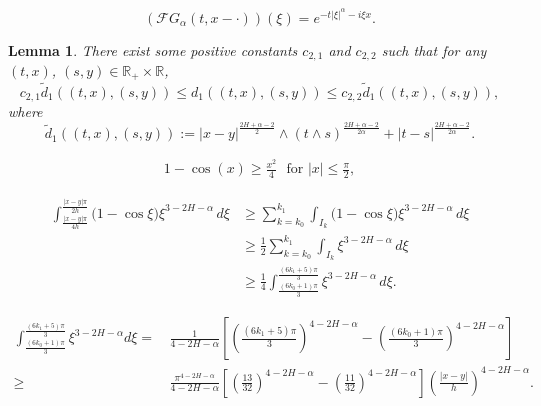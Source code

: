 \documentclass[10pt,a4paper]{amsart}
\newtheorem{lemma}{Lemma}
\def\RR{\mathbb{R}}
\begin{document}
\begin{equation}\label{Fourier}
(\mathcal {F}G_{\alpha}(t,x-\cdot))(\xi)=e^{-t|\xi|^{\alpha}-i\xi x}.
\end{equation}

\begin{lemma}\label{metric} There exist some  positive constants $c_{2,1}$ and $c_{2, 2}$ such that for any  $(t,x)$, $(s,y)\in \RR_+\times\RR$,
\begin{equation}\label{equ-metric-d1}
c_{2,1}\tilde d_{1}((t,x),(s,y))\le  d_1 ((t,x), (s,y)) \le c_{2,2}\tilde d_{1}((t,x),(s,y)),
\end{equation}
  where
\begin{equation*}
\tilde d_{1}((t,x),(s,y))
:= |x-y|^{\frac{2H+\alpha-2}{2}}\wedge(t\wedge s)^{\frac{2H+\alpha-2}{2\alpha}}+|t-s|^{\frac{2H+\alpha-2}{2\alpha}}.
\end{equation*}
\end{lemma}

\begin{align}\label{eq elem}
1-\cos(x)\ge \frac{x^2}{4} \ \ \ \text{for } |x|\le \frac{\pi}{2},
\end{align}

\begin{equation}\label{L-h-dEu0}
\begin{split}
\int_{\frac{|x-y|\pi}{4h}}^{\frac{|x-y|\pi}{2h}} \bigl(1-\cos\xi\bigr)  \xi^{3-2H-\alpha} \,d\xi
&\geq \sum_{k=k_0}^{k_1} \int_{I_k} \bigl(1-\cos\xi\bigr) \xi^{3-2H-\alpha} \,d\xi \\
&\geq \frac{1}{2}\sum_{k=k_0}^{k_1} \int_{I_k} \xi^{3-2H-\alpha} \,d\xi \\
&\geq \frac{1}{4} \int_{\frac{(6k_0+1)\pi}{3}}^{\frac{(6k_1+5)\pi}{3}} \xi^{3-2H-\alpha} \,d\xi.
\end{split}
\end{equation}

\begin{equation}\label{L-h-dEu0-2}
\begin{split}
 \int_{\frac{(6k_0+1)\pi}{3}}^{\frac{(6k_1+5)\pi}{3}} \xi^{3-2H-\alpha}  d\xi 
= &\,  \frac{1}{4-2H-\alpha} \left[ \left(\frac{(6k_1+5)\pi}{3}\right)^{4-2H-\alpha} - \left(\frac{(6k_0+1)\pi}{3}\right)^{4-2H-\alpha} \right] \\
 \geq &\,  \frac{\pi^{4-2H-\alpha}}{4-2H-\alpha} \left[ \left(\frac{13}{32}\right)^{4-2H-\alpha} - \left(\frac{11}{32}\right)^{4-2H-\alpha} \right] \left(\frac{|x-y|}{h}\right)^{4-2H-\alpha}.
\end{split}
\end{equation}
\end{document}
